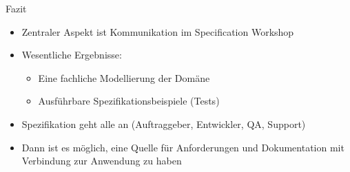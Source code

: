 %
%

\begin{frame}{Fazit}

\begin{itemize}
	\item Zentraler Aspekt ist Kommunikation im Specification Workshop
	\item Wesentliche Ergebnisse:
	\begin{itemize}
		\item Eine fachliche Modellierung der Domäne
		\item Ausführbare Spezifikationsbeispiele (Tests)
	\end{itemize}
	\item Spezifikation geht alle an (Auftraggeber, Entwickler, QA, Support)
	\item Dann ist es möglich, eine Quelle für Anforderungen und Dokumentation mit Verbindung zur Anwendung zu haben
\end{itemize}

\end{frame}

